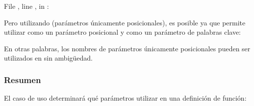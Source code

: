 \documentclass[a5paper,10pt,spanish]{sphinxmanual}
\begin{document}
\begin{sphinxVerbatim}[commandchars=\\\{\}]
  
  File , line , in 
: 
\end{sphinxVerbatim}

\sphinxAtStartPar
Pero utilizando \sphinxcode{\sphinxupquote{/}} (parámetros únicamente posicionales), es posible ya que permite utilizar  como un parámetro posicional y  como un parámetro de palabras clave:

\begin{sphinxVerbatim}[commandchars=\\\{\}]
   
       
   
\end{sphinxVerbatim}

\sphinxAtStartPar
En otras palabras, los nombres de parámetros únicamente posicionales pueden ser utilizados en  sin ambigüedad.


\subsubsection{Resumen}
\label{\detokenize{tutorial/controlflow:recap}}
\sphinxAtStartPar
El caso de uso determinará qué parámetros utilizar en una definición de función:

\begin{sphinxVerbatim}[commandchars=\\\{\}]
       
\end{sphinxVerbatim}
\end{document}
